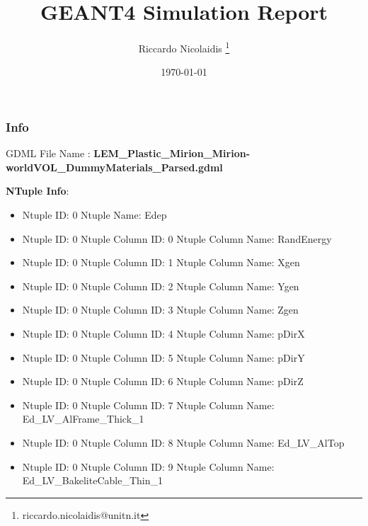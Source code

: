 \documentclass[8pt]{beamer}
\title{GEANT4 Simulation Report}
\author{Riccardo Nicolaidis \footnote{riccardo.nicolaidis@unitn.it}}
\date{\today}
\begin{document}
        
            \begin{frame}
                \titlepage
            \end{frame}
            
            \begin{frame}
                \frametitle{Info}
            
                \centering
                GDML File Name : \textbf{ LEM\_Plastic\_Mirion\_Mirion-worldVOL\_DummyMaterials\_Parsed.gdml}
                
                
                \vspace{2 cm}
                \textbf{NTuple Info}:
                \vspace{1 cm}
                
        \begin{itemize}
        
        \item Ntuple ID: 0 Ntuple Name: Edep
        
        \item Ntuple ID: 0 Ntuple Column ID: 0 Ntuple Column Name: RandEnergy
        
        \item Ntuple ID: 0 Ntuple Column ID: 1 Ntuple Column Name: Xgen
        
        \item Ntuple ID: 0 Ntuple Column ID: 2 Ntuple Column Name: Ygen
        
        \item Ntuple ID: 0 Ntuple Column ID: 3 Ntuple Column Name: Zgen
        
        \item Ntuple ID: 0 Ntuple Column ID: 4 Ntuple Column Name: pDirX
        
        \item Ntuple ID: 0 Ntuple Column ID: 5 Ntuple Column Name: pDirY
        
        \item Ntuple ID: 0 Ntuple Column ID: 6 Ntuple Column Name: pDirZ
        
        \item Ntuple ID: 0 Ntuple Column ID: 7 Ntuple Column Name: Ed\_LV\_AlFrame\_Thick\_1
        
        \item Ntuple ID: 0 Ntuple Column ID: 8 Ntuple Column Name: Ed\_LV\_AlTop
        
        \item Ntuple ID: 0 Ntuple Column ID: 9 Ntuple Column Name: Ed\_LV\_BakeliteCable\_Thin\_1
        

\end{itemize}
\end{frame}
\end{document}
